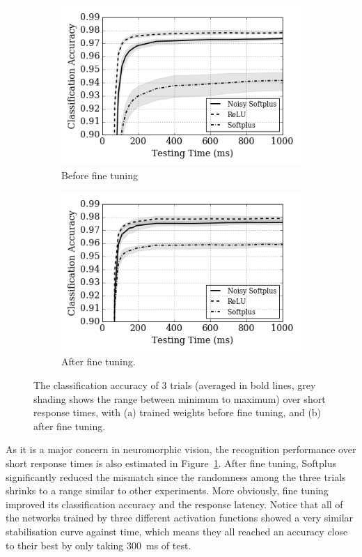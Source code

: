 \documentclass{article}
\begin{document}
\begin{figure}[htb!]
	\centering
	\begin{subfigure}[t]{0.49\textwidth}
		\includegraphics[width=\textwidth]{pics_iconip/8-2.png}
		\caption{Before fine tuning}
	\end{subfigure}
	\begin{subfigure}[t]{0.49\textwidth}
		\includegraphics[width=\textwidth]{pics_iconip/8-3.png}
		\caption{After fine tuning.}
	\end{subfigure}
	
	\caption{The classification accuracy of 3 trials (averaged in bold lines, grey shading shows the range between minimum to maximum) over short response times, with (a) trained weights before fine tuning, and (b) after fine tuning.}
	\label{fig:ca_time}	
\end{figure}

As it is a major concern in neuromorphic vision, the recognition performance over short response times is also estimated in Figure~\ref{fig:ca_time}.
After fine tuning, Softplus significantly reduced the mismatch since the randomness among the three trials shrinks to a range similar to other experiments.
More obviously, fine tuning improved its classification accuracy and the response latency.
Notice that all of the networks trained by three different activation functions showed a very similar stabilisation curve against time, which means they all reached an accuracy close to their best by only taking 300~ms of test. 
\end{document}
